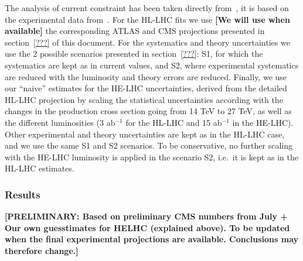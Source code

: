 The analysis of current constraint has been taken directly from~\cite{deBlas:2018tjm}, it is based on the experimental data from~\cite{Aad:2014eha,Aaboud:2018xdt,Khachatryan:2014ira,CMS:2017rli,Aad:2014eva,Aaboud:2017vzb,Khachatryan:2014jba,Sirunyan:2017exp,Aaboud:2017jvq,Sirunyan:2018shy,ATLAS:2014aga,Aad:2015ona,ATLAS:2016gld,Chatrchyan:2013iaa,Sirunyan:2018egh,Aaboud:2017jvq,Sirunyan:2018shy,ATLAS-CONF-2018-004,Aad:2014xzb,Aaboud:2017rss,Chatrchyan:2013zna,CMS:2016mmc,Aad:2015gra,Aaboud:2017xsd,Khachatryan:2014qaa,Sirunyan:2018mvw,Sirunyan:2018ygk,Sirunyan:2017elk,Aad:2015vsa,Aaboud:2017jvq,Chatrchyan:2014nva,Sirunyan:2017khh,Sirunyan:2018shy,Khachatryan:2016vau,Aaboud:2017ojs,Khachatryan:2016vau,CMS-PAS-HIG-17-019,Aad:2015gba,Aaboud:2017uhw,Chatrchyan:2013vaa,CMS-PAS-HIG-17-007,Aaltonen:2013ipa,Abazov:2013gmz}. 
For the HL-LHC fits we use {\bf [We will use when available]} the corresponding ATLAS and CMS projections presented in section~\ref{???} of this document.  For the systematics and theory uncertainties we use the 2 possible scenarios presented in section~\ref{???}: S1, for which the systematics are kept as in current values, and S2, where experimental systematics are reduced with the luminosity and theory errors are reduced.
%
Finally, we use our ``naive'' estimates for the HE-LHC uncertainties, derived from the
detailed HL-LHC projection by scaling the statistical uncertainties according with the changes in the production cross section going from 14 TeV to 27 TeV, as well as the different luminosities (3 ab$^{-1}$ for the HL-LHC and 15 ab$^{-1}$ in the HE-LHC).
Other experimental and theory uncertainties are kept as in the HL-LHC case, and we use the same S1 and S2 scenarios. To be conservative, no further scaling with the HE-LHC luminosity is applied in the scenario S2, i.e.~it is kept as in the HL-LHC estimates. 
\subsubsection{Results}
{\bf [PRELIMINARY: Based on preliminary CMS numbers from July + Our own guesstimates for HELHC (explained above). 
To be updated when the final experimental projections are available. Conclusions may therefore change.]}\\

